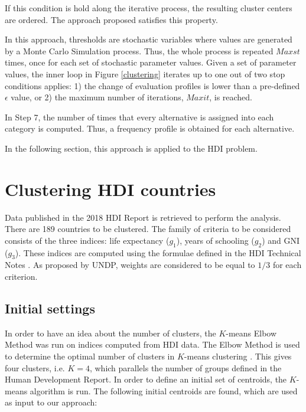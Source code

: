 \documentclass[]{elsarticle}
\theoremstyle{definition}
\begin{document}
\noindent
If this condition is hold along the iterative process, the resulting cluster centers are ordered. The approach proposed satisfies this property.


In this approach, thresholds are stochastic variables where values are generated by a Monte Carlo Simulation process. Thus, the whole process is repeated $Maxst$ times, once for each set of stochastic parameter values.  Given a set of parameter values, the inner loop in Figure \ref{clustering} iterates up to one out of two stop conditions applies: 1) the change of evaluation profiles is  lower than a pre-defined $\epsilon$ value, or 2) the maximum number of iterations, $Maxit$,  is reached.   

In Step 7, the number of times that every alternative is assigned into each category is computed. Thus, a frequency profile is obtained for each alternative.   

In the following section, this approach is applied to the HDI problem.





\section{Clustering HDI countries}\label{application}

Data published in the 2018 HDI Report is retrieved to perform the analysis. There are 189 countries to be clustered. The family of criteria to be considered consists of the three indices: life expectancy ($g_1$), years of schooling ($g_2$) and GNI  ($g_3$).  These indices are computed using the formulae defined in the HDI Technical Notes \citep{UNDP2019}.   As proposed by UNDP, weights are considered to be equal to $1/3$ for each criterion. 

\subsection{Initial settings}

In order to have an idea about the number of clusters, the $K$-means Elbow Method was run on indices computed from HDI data. The Elbow Method is used to determine the optimal number of clusters in $K$-means clustering \citep{Ketchen1996}. This gives four clusters,    i.e. $K=4$, which parallels the number of groups defined in the Human Development Report. In order to define an initial set of centroids, the $K$-means algorithm is run.   The following initial centroids are found, which are used as input to our approach:
\end{document}
